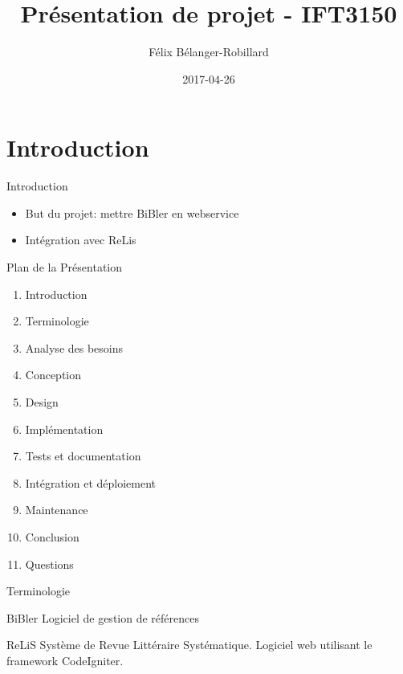 \documentclass{beamer}
\title[Un webservice pour BiBler]{Présentation de projet - IFT3150}
\author{Félix Bélanger-Robillard}
\institute{DIRO}
\date{2017-04-26}
\begin{document}
\begin{frame}
  \titlepage
\end{frame}


\section{Introduction}

\begin{frame}{Introduction}

\begin{itemize}
  \item But du projet: mettre BiBler en webservice
  \item Intégration avec ReLis
\end{itemize}


\end{frame}

\begin{frame}{Plan de la Présentation}

\begin{enumerate}
  \item Introduction
  \item Terminologie
  \item Analyse des besoins
  \item Conception
  \item Design
  \item Implémentation
  \item Tests et documentation
  \item Intégration et déploiement
  \item Maintenance
  \item Conclusion
  \item Questions
\end{enumerate}

\end{frame}

\begin{frame}{Terminologie}

\begin{block}{BiBler}
Logiciel de gestion de références
\end{block}

\begin{block}{ReLiS}
Système de Revue Littéraire Systématique. Logiciel web utilisant le framework CodeIgniter.
\end{block}

\end{frame}
\end{document}
